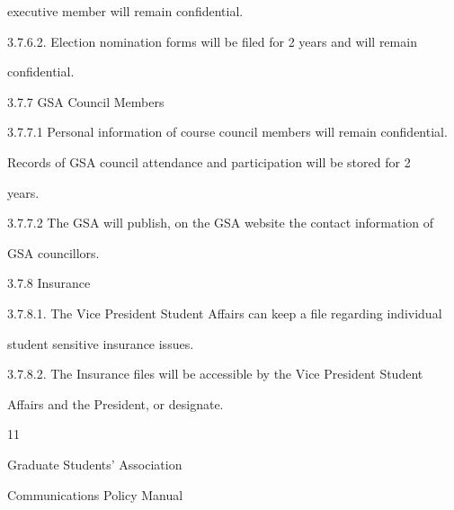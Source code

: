           executive member will remain confidential.  



3.7.6.2. Election nomination forms will be filed for 2 years and will remain  



          confidential.  



  

3.7.7  GSA Council Members  

  

3.7.7.1 Personal information of course council members will remain confidential.  



          Records of GSA council attendance and participation will be stored for 2  



          years.  



3.7.7.2 The GSA will publish, on the GSA website the contact information of  



          GSA councillors.  



3.7.8  Insurance  

  

3.7.8.1.       The Vice President  Student Affairs can keep a file regarding individual  



               student sensitive insurance issues.   



3.7.8.2.       The  Insurance  files  will  be  accessible  by  the  Vice  President  Student  



              Affairs and the President, or designate.   



  

  

  

  

  

  



                                                         11  

                                        

                                      Graduate Students’ Association  

                                     Communications Policy Manual  

  

